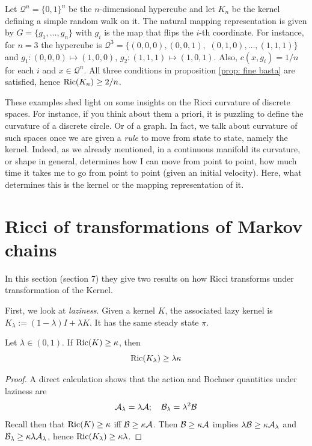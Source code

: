 \begin{example}
    Let $\mathcal{Q}^n=\{0,1\}^n$ be the $n$-dimensional hypercube and let $K_n$ be the kernel defining a simple random walk on it. The natural mapping representation is given by $G = \{g_1,\ldots,g_n\}$ with $g_i$ is the map that flips the $i$-th coordinate. For instance, for $n=3$ the hypercube is $\mathcal{Q}^3=\{(0,0,0),(0,0,1),$ 
    $(0,1,0),\ldots,(1,1,1)\}$ and $g_1: (0,0,0)\mapsto(1,0,0)$, $g_2:(1,1,1)\mapsto(1,0,1)$. Also, $c(x,g_i)=1/n$ for each $i$ and $x\in\mathcal{Q}^n$. All three conditions in proposition \ref{prop: fine basta} are satisfied, hence $\mathop{\mathrm{Ric}}\nolimits(K_n)\ge 2/n$.
\end{example}

\begin{remark}
    These examples shed light on some insights on the Ricci curvature of discrete spaces. For instance, if you think about them a priori, it is puzzling to define the curvature of a discrete circle. Or of a graph. In fact, we talk about curvature of such spaces once we are given a \emph{rule} to move from state to state, namely the kernel. Indeed, as we already mentioned, in a continuous manifold its curvature, or shape in general, determines how I can move from point to point, how much time it takes me to go from point to point (given an initial velocity). Here, what determines this is the kernel or the mapping representation of it. 
\end{remark}


\section{Ricci of transformations of Markov chains}

In this section (section 7) they give two results on how Ricci transforms under transformation of the Kernel. 

First, we look at \emph{laziness}. Given a kernel $K$, the associated lazy kernel is $K_\lambda:=(1-\lambda)I+\lambda K$. It has the same steady state $\pi$. 
\begin{proposition}
    Let $\lambda \in (0,1)$. If $\mathop{\mathrm{Ric}}\nolimits(K)\ge \kappa$, then
    \[
    \mathop{\mathrm{Ric}}\nolimits(K_\lambda)\ge\lambda\kappa
    \]
    \begin{proof}
        A direct calculation shows that the action and Bochner quantities under laziness are
        \[
        \mathcal{A}_\lambda=\lambda \mathcal{A}; \quad \mathcal{B}_\lambda=\lambda^2\mathcal{B}
        \]
        Recall then that $\mathop{\mathrm{Ric}}\nolimits(K)\ge \kappa$ iff $\mathcal{B}\ge \kappa\mathcal{A}$. Then $\mathcal{B}\ge\kappa\mathcal{A}$ implies $\lambda \mathcal{B}\ge \kappa \mathcal{A}_\lambda$ and $\mathcal{B}_\lambda\ge \kappa\lambda \mathcal{A}_\lambda$, hence $\mathop{\mathrm{Ric}}\nolimits(K_\lambda)\ge \kappa\lambda$.
    \end{proof}
\end{proposition}

